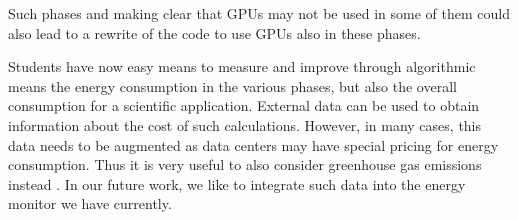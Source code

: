 \documentclass[utf8]{FrontiersinVancouver} %
\begin{document}
Such phases and making clear that GPUs may not be used in some of them could also lead to a rewrite of the code to use GPUs also in these phases.

Students have now easy means to measure and improve through algorithmic means the energy consumption in the various phases, but also the overall consumption for a scientific application. External data \cite{energy-price} can be used to obtain information about the cost of such calculations. However, in many cases, this data needs to be augmented as data centers may have special pricing for energy consumption. Thus it is very useful to also consider greenhouse gas emissions instead \cite{greenhouse-calc}. In our future work, we like to integrate such data into the energy monitor we have currently.

\begin{figure}[htb]


\end{figure}
\end{document}
